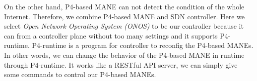 On the other hand, P4-based MANE can not detect the condition of the whole Internet. Therefore, we combine P4-based MANE and SDN controller. Here we select {\em Open Network Operating System (ONOS)} to be our controller because it can from a controller plane without too many settings and it supports P4-runtime. P4-runtime is a program for controller to reconfig the P4-based MANEs. In other words, we can change the behavior of the P4-based MANE in runtime through P4-runtime. It works like a RESTful API server, we can simply give some commands to control our P4-based MANEs. 